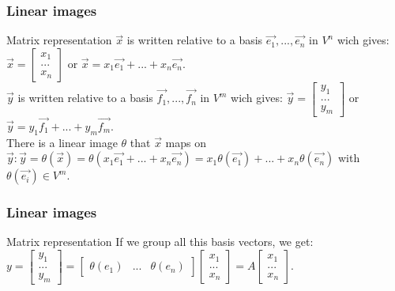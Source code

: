 \begin{frame}
	\frametitle{Linear images}
	\begin{block}{Matrix representation}
		$\overrightarrow{x}$ is written relative to a basis $\overrightarrow{e_1},...,\overrightarrow{e_n}$ in $V^n$ wich gives: $\overrightarrow{x}=\begin{bmatrix}
		x_1\\...\\x_n
		\end{bmatrix}$ or $ \overrightarrow{x}=x_1\overrightarrow{e_1}+...+x_n\overrightarrow{e_n}$.\\ $\overrightarrow{y}$ is written relative to a basis $\overrightarrow{f_1},...,\overrightarrow{f_n}$ in $V^m$ wich gives: $\overrightarrow{y}=\begin{bmatrix}
		y_1\\...\\y_m
		\end{bmatrix}$ or $ \overrightarrow{y}=y_1\overrightarrow{f_1}+...+y_m\overrightarrow{f_m}$. \\
		There is a linear image $\theta$ that $\overrightarrow{x}$ maps on $\overrightarrow{y}:\overrightarrow{y}=\theta(\overrightarrow{x})=\theta(x_1\overrightarrow{e_1}+...+x_n\overrightarrow{e_n})=x_1\theta(\overrightarrow{e_1})+...+x_n\theta(\overrightarrow{e_n})$ with $\theta(\overrightarrow{e_i})\in V^m$.
	\end{block}
\end{frame}

\begin{frame}
	\frametitle{Linear images}
	\begin{block}{Matrix representation}
		If we group all this basis vectors, we get: $y=\begin{bmatrix}
		y_1\\...\\y_m \end{bmatrix}=\begin{bmatrix}
		\theta(e_1) & ... & \theta(e_n)
		\end{bmatrix}\begin{bmatrix}
		x_1\\...\\x_n
		\end{bmatrix}=A\begin{bmatrix}
		x_1\\...\\x_n
		\end{bmatrix}$.\\
		\vspace{4mm}
	\end{block}
\end{frame}

